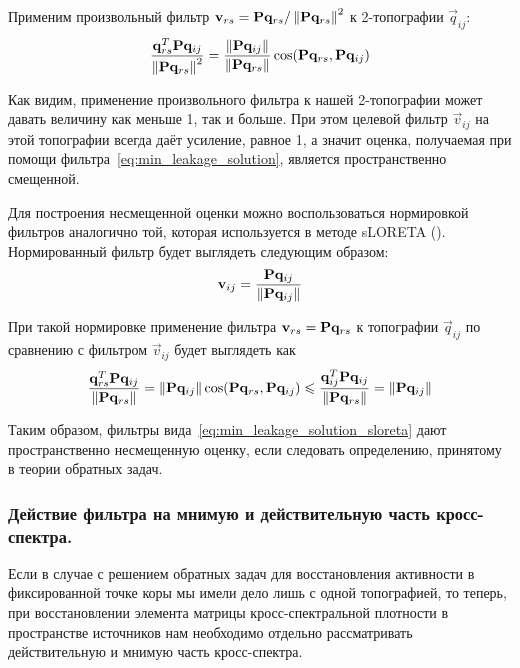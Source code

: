 Применим произвольный фильтр $\mathbf{v}_{rs} = \mathbf{P} \mathbf{q}_{rs} / \left\lVert\mathbf{P} \mathbf{q}_{rs}\right\rVert^2$ к
2-топографии $\vec{q}_{ij}$:
\begin{equation}
    \frac{\mathbf{q}_{rs}^T\mathbf{P} \mathbf{q}_{ij}}{\left\lVert\mathbf{P}\mathbf{q}_{rs}\right\rVert^2} =
    \frac{
        \left\lVert\mathbf{P} \mathbf{q}_{ij}\right\rVert
    }{
        \left\lVert\mathbf{P}\mathbf{q}_{rs}\right\rVert
    }
    \cos(\mathbf{P}\mathbf{q}_{rs}, \mathbf{P} \mathbf{q}_{ij})
\end{equation}

Как видим, применение произвольного фильтра к нашей 2-топографии может давать
величину как меньше 1, так и больше.  При этом целевой фильтр $\vec{v}_{ij}$ на
этой топографии всегда даёт усиление, равное 1, а значит оценка, получаемая при
помощи фильтра~\ref{eq:min_leakage_solution}, является пространственно
смещенной.

Для построения несмещенной оценки можно воспользоваться нормировкой фильтров аналогично той, которая
используется в методе sLORETA (\cite{sLORETA}). Нормированный фильтр будет выглядеть следующим образом:
\begin{equation}
    \mathbf{v}_{ij} = \frac{\mathbf{P} \mathbf{q}_{ij}}{\left\lVert\mathbf{P} \mathbf{q}_{ij}\right\rVert}
    \label{eq:min_leakage_solution_sloreta}
\end{equation}

При такой нормировке применение фильтра $\mathbf{v}_{rs} = \mathbf{P} \mathbf{q}_{rs}$
к топографии $\vec{q}_{ij}$ по сравнению с фильтром $\vec{v}_{ij}$ будет выглядеть как
\begin{equation}
    \frac{\mathbf{q}_{rs}^T\mathbf{P} \mathbf{q}_{ij}}{\left\lVert\mathbf{P}\mathbf{q}_{rs}\right\rVert} =
    \left\lVert\mathbf{P} \mathbf{q}_{ij}\right\rVert \cos(\mathbf{P}\mathbf{q}_{rs}, \mathbf{P} \mathbf{q}_{ij}) \leqslant
    \frac{\mathbf{q}_{ij}^T\mathbf{P} \mathbf{q}_{ij}}{\left\lVert\mathbf{P}\mathbf{q}_{rs}\right\rVert} =
    \left\lVert\mathbf{P} \mathbf{q}_{ij}\right\rVert
\end{equation}

Таким образом, фильтры вида~\ref{eq:min_leakage_solution_sloreta} дают
пространственно несмещенную оценку, если следовать определению, принятому в
теории обратных задач.

\subsubsection{Действие фильтра на мнимую и действительную часть кросс-спектра.}

Если в случае с решением обратных задач для восстановления активности в
фиксированной точке коры мы имели дело лишь с одной топографией, то теперь, при
восстановлении элемента матрицы кросс-спектральной плотности в пространстве
источников нам необходимо отдельно рассматривать действительную и мнимую часть
кросс-спектра.

